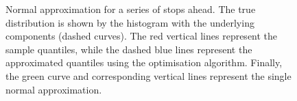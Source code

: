 \begin{knitrout}\small
{}\color{fgcolor}\begin{figure}

{\centering {}\newline
{}\newline
{}\newline
{}

}

\caption[Normal approximation for a series of stops ahead]{Normal approximation for a series of stops ahead. The true distribution is shown by the histogram with the underlying components (dashed curves). The red vertical lines represent the sample quantiles, while the dashed blue lines represent the approximated quantiles using the optimisation algorithm. Finally, the green curve and corresponding vertical lines represent the single normal approximation.}\label{fig:normal_approx}
\end{figure}


\end{knitrout}

